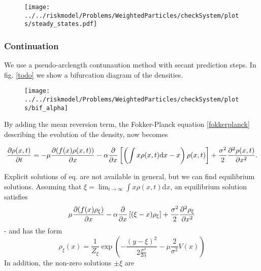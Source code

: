 \begin{center}
\begin{figure}
\texttt{[image: ../../riskmodel/Problems/WeightedParticles/checkSystem/plots/steady\_states.pdf]}
\caption{\label{fig:bif_anal}}
\end{figure}
\end{center}



\subsubsection{Continuation}
We use a pseudo-arclength contunaution method with secant prediction steps.
In fig. \ref{todo} we show a bifurcation diagram of the densities. 





\begin{center}
\begin{figure}
\texttt{[image: ../../riskmodel/Problems/WeightedParticles/checkSystem/plots/bif\_alpha]}
\caption{\label{fig:bif_anal}}
\end{figure}
\end{center}






By adding the mean reversion term, the Fokker-Planck equation \eqref{fokkerplanck}  describing the evolution of the density, now becomes

\begin{equation}
\label{fp_mean_field}
\frac{\partial \rho(x,t)}{\partial t} = - \mu \frac{\partial ( f(x) \rho(x,t))}{\partial x} - \alpha \frac{\partial }{\partial x} \left[ \left(\int x \rho(x,t) \mathrm{d}x  -x \right) \rho(x,t) \right] + \frac{\sigma^2}{2}  \frac{\partial^2 \rho(x,t)}{\partial x^2} .
\end{equation}

Explicit solutions of eq. \label{fp_mean_field} are not available in general, but we can find equilibrium solutions. Assuming that \(\xi = \lim_{t \to \infty} \int x \rho(x,t) \mathrm{d}x \), an equilibrium solution satisfies
\begin{equation}
\mu \frac{\partial ( f(x) \rho_{\xi}) }{\partial x}   - \alpha \frac{\partial }{\partial x} \left [( \xi -x) \rho_{\xi}  \right] +\frac{\sigma^2}{2} \frac{\partial^2 \rho_{\xi}}{\partial x^2}
\end{equation}
 -
and has the form 
\begin{equation}
\rho_{\xi}(x) = \frac{1} {Z_{\xi}} \exp{ \left( -\frac{(y-\xi)^2}{2 \frac{\sigma^2}{2 \alpha}} - \mu \frac{2}{\sigma^2} V(x)  \right)}
\end{equation}
In addition, the non-zero solutions $\pm\xi$ are


